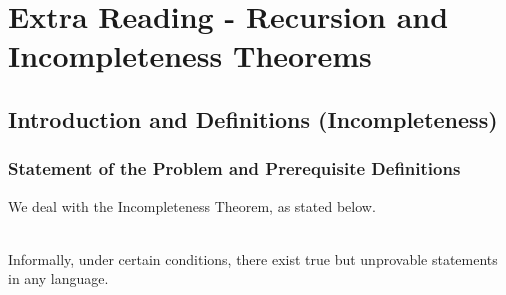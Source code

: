\documentclass[openany]{book}
\begin{document}
\part{Extra Reading - Recursion and Incompleteness Theorems}
\chapter{Introduction and Definitions (Incompleteness)}
\section{Statement of the Problem and Prerequisite Definitions}
We deal with the Incompleteness Theorem, as stated below. 
\begin{mytheorem}
     \\
    Informally, under certain conditions, there exist true but unprovable statements in any language.
\end{mytheorem}
\end{document}
